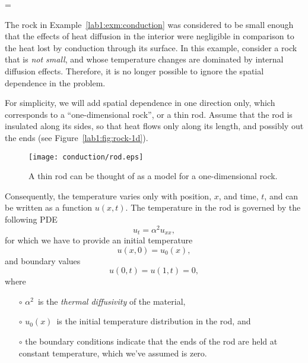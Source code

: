 \documentclass{article}
\makeatletter
\let\realnormalsize=\normalsize
\def\liih@math{\ifmmode$\else\bad@math\fi}
\def\adjustnormalsize{\def\normalsize{\mathsurround=0pt \realnormalsize
 \parindent=0pt\abovedisplayskip=0pt\belowdisplayskip=0pt}%
 \def\phantompar{\csname par\endcsname}\normalsize}%
\newcommand\lthtmlvboxmathA{\adjustnormalsize\setbox\sizebox=\vbox\bgroup %
 \let\ifinner=\iffalse \let\)\liih@math }%
\newcommand\lthtmlmathtype[1]{\gdef\lthtmlmathenv{#1}}%
\newcommand\lthtmlfigureA[1]{\let\@savefreelist\@freelist
       \lthtmlmathtype{#1}\lthtmlvboxmathA}%
\makeatother
\begin{document}
{\newpage\clearpage
\lthtmlfigureA{example251}%
\begin{example}

  The rock in Example~\ref{lab1:exm:conduction} was considered to be small
  enough that the effects of heat diffusion in the interior
  were negligible in comparison to the heat lost by conduction
  through its surface.  
  In this example, consider a rock that is \emph{not small}, and whose
  temperature changes are dominated by internal diffusion effects.
  Therefore, it is no longer possible to ignore the spatial dependence
  in the problem.  
\par For simplicity, we will add spatial dependence in one direction
  only, which corresponds to a ``one-dimensional rock'', or a thin
  rod.  Assume that the rod is insulated along its sides, so that heat
  flows only along its length, and possibly out the ends (see
  Figure~\ref{lab1:fig:rock-1d}).
  \begin{figure}[htbp]
    \begin{center}
      \leavevmode
\texttt{[image: conduction/rod.eps]}
      \caption{A thin rod can be thought of as a model for a
        one-dimensional rock.}    \end{center}
  \end{figure}
  Consequently, the temperature varies only with position, $x$, and
  time, $t$,
  and can be written as a function $u(x,t)$.   
  The temperature in the rod is governed by the following PDE
  \begin{displaymath}
    u_t = \alpha^2 u_{xx},
  \end{displaymath}
  for which we have to provide an initial temperature 
  \begin{displaymath} 
    u(x,0) = u_0(x),
  \end{displaymath}
  and boundary values
  \begin{displaymath}
    u(0,t)=u(1,t)=0,
  \end{displaymath}
  where 
  \begin{itemize}
  \item[$\circ$] $\alpha^2$\  is the \emph{thermal diffusivity} of the
    material, 
  \item[$\circ$] $u_0(x)$\  is the initial temperature distribution in the
    rod,  and
  \item[$\circ$] the boundary conditions indicate that the ends of the rod
    are held at constant temperature, which we've assumed is zero.

\end{itemize}
\end{example}}
\end{document}
